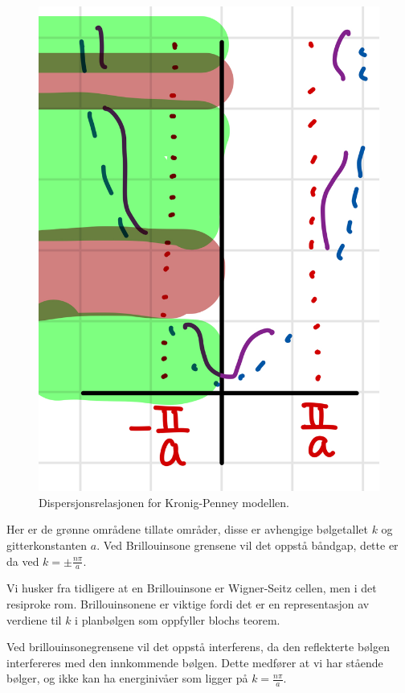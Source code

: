 \begin{figure}[!htb]
    \centering
    \includegraphics[scale=0.2]{Bilder/SamtaleTema5/disp-relasjon-KP.jpeg}
    \caption{Dispersjonsrelasjonen for Kronig-Penney modellen.}
    \label{fig:dispRel}
\end{figure}

Her er de grønne områdene tillate områder, disse er avhengige bølgetallet $k$ og gitterkonstanten $a$. Ved Brillouinsone grensene vil det oppstå båndgap, dette er da ved $k=\pm\frac{n\pi}{a}$.

Vi husker fra tidligere at en Brillouinsone er Wigner-Seitz cellen, men i det resiproke rom. Brillouinsonene er viktige fordi det er en representasjon av verdiene til $k$ i planbølgen som oppfyller blochs teorem.

Ved brillouinsonegrensene vil det oppstå interferens, da den reflekterte bølgen interfereres med den innkommende bølgen. Dette medfører at vi har stående bølger, og ikke kan ha energinivåer som ligger på $k = \frac{n\pi}{a}$.

